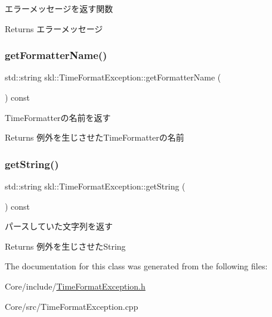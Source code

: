 エラーメッセージを返す関数 

\begin{DoxyReturn}{Returns}
エラーメッセージ 
\end{DoxyReturn}
\hypertarget{classskl_1_1_time_format_exception_a1b6c5b3b707be88e33fe1d2f39482b76}{}\label{classskl_1_1_time_format_exception_a1b6c5b3b707be88e33fe1d2f39482b76} 
\subsubsection{\texorpdfstring{get\+Formatter\+Name()}{getFormatterName()}}
{\footnotesize\ttfamily std\+::string skl\+::\+Time\+Format\+Exception\+::get\+Formatter\+Name (\begin{DoxyParamCaption}{ }\end{DoxyParamCaption}) const}



Time\+Formatterの名前を返す 

\begin{DoxyReturn}{Returns}
例外を生じさせた\+Time\+Formatterの名前 
\end{DoxyReturn}
\hypertarget{classskl_1_1_time_format_exception_adbc030198a2811494d377c89779d4aa3}{}\label{classskl_1_1_time_format_exception_adbc030198a2811494d377c89779d4aa3} 
\subsubsection{\texorpdfstring{get\+String()}{getString()}}
{\footnotesize\ttfamily std\+::string skl\+::\+Time\+Format\+Exception\+::get\+String (\begin{DoxyParamCaption}{ }\end{DoxyParamCaption}) const}



パースしていた文字列を返す 

\begin{DoxyReturn}{Returns}
例外を生じさせた\+String 
\end{DoxyReturn}


The documentation for this class was generated from the following files\+:\begin{DoxyCompactItemize}
\item 
Core/include/\hyperlink{_time_format_exception_8h}{Time\+Format\+Exception.\+h}\item 
Core/src/Time\+Format\+Exception.\+cpp\end{DoxyCompactItemize}
